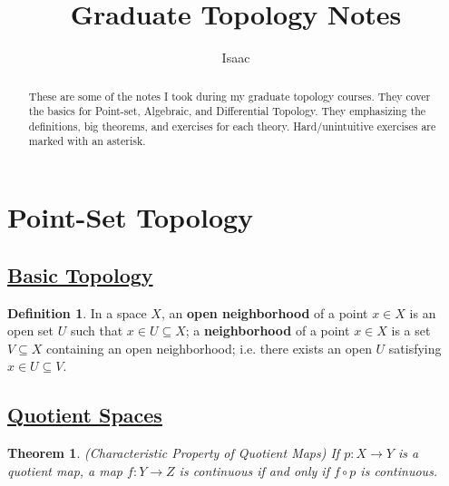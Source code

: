\documentclass[11pt]{amsart}
\title{Graduate Topology Notes}
\author{\vspace{-10pt}Isaac}
\newtheorem*{theorem*}{Theorem}
\theoremstyle{definition}
\newtheorem*{definition*}{Definition}
\renewcommand\:{\colon}
\newcommand{\1}{\mathds{1}}
\begin{document}
\begin{abstract}
	\vspace{-10pt}These are some of the notes I took during my graduate topology courses. They cover the basics for Point-set, Algebraic, and Differential Topology. They emphasizing the definitions, big theorems, and exercises for each theory. Hard/unintuitive exercises are marked with an asterisk.
\end{abstract}

\maketitle
\vspace{-15pt}

\setcounter{tocdepth}{1}
\tableofcontents



\section*{Point-Set Topology}

\subsection*{\underline{Basic Topology}}

\begin{definition*}
	In a space $X$, an \textbf{open neighborhood} of a point $x \in X$ is an open set $U$ such that $x \in U \subseteq X$; a \textbf{neighborhood} of a point $x \in X$ is a set $V \subseteq X$ containing an open neighborhood; i.e. there exists an open $U$ satisfying $x \in U \subseteq V$.
\end{definition*}

\subsection*{\underline{Quotient Spaces}}

\begin{theorem*}
	\textnormal{(Characteristic Property of Quotient Maps)} If $p\: X \to Y$ is a quotient map, a map $f\: Y \to Z$ is continuous if and only if $f \circ p$ is continuous.
\end{theorem*}

\begin{center}
\end{center}
\end{document}
